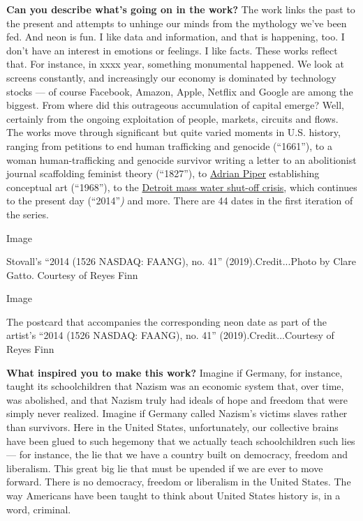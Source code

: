 \textbf{Can you describe what's going on in the work?} The work links
the past to the present and attempts to unhinge our minds from the
mythology we've been fed. And neon is fun. I like data and information,
and that is happening, too. I don't have an interest in emotions or
feelings. I like facts. These works reflect that. For instance, in xxxx
year, something monumental happened. We look at screens constantly, and
increasingly our economy is dominated by technology stocks --- of course
Facebook, Amazon, Apple, Netflix and Google are among the biggest. From
where did this outrageous accumulation of capital emerge? Well,
certainly from the ongoing exploitation of people, markets, circuits and
flows. The works move through significant but quite varied moments in
U.S. history, ranging from petitions to end human trafficking and
genocide (``1661''), to a woman human-trafficking and genocide survivor
writing a letter to an abolitionist journal scaffolding feminist theory
(``1827''), to
\href{https://www.nytimes3xbfgragh.onion/2018/06/27/magazine/adrian-pipers-self-imposed-exile-from-america-and-from-race-itself.html}{Adrian
Piper} establishing conceptual art (``1968''), to the
\href{https://www.nytimes3xbfgragh.onion/2014/07/19/us/protesters-picket-detroit-over-move-to-shut-off-water.html}{Detroit
mass water shut-off crisis}, which continues to the present day
(``2014''\emph{)} and more. There are 44 dates in the first iteration of
the series.

Image

Stovall's ``2014 (1526 NASDAQ: FAANG), no. 41'' (2019).Credit...Photo by
Clare Gatto. Courtesy of Reyes Finn

Image

The postcard that accompanies the corresponding neon date as part of the
artist's ``2014 (1526 NASDAQ: FAANG), no. 41'' (2019).Credit...Courtesy
of Reyes Finn

\textbf{What inspired you to make this work?} Imagine if Germany, for
instance, taught its schoolchildren that Nazism was an economic system
that, over time, was abolished, and that Nazism truly had ideals of hope
and freedom that were simply never realized. Imagine if Germany called
Nazism's victims slaves rather than survivors. Here in the United
States, unfortunately, our collective brains have been glued to such
hegemony that we actually teach schoolchildren such lies --- for
instance, the lie that we have a country built on democracy, freedom and
liberalism. This great big lie that must be upended if we are ever to
move forward. There is no democracy, freedom or liberalism in the United
States. The way Americans have been taught to think about United States
history is, in a word, criminal.

